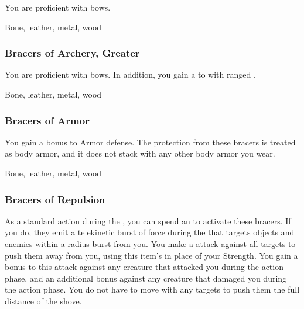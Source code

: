 You are proficient with bows.



 Bone, leather, metal, wood


\lowercase{\hypertarget{item:Bracers of Archery, Greater}{}}\label{item:Bracers of Archery, Greater}
\hypertarget{item:Bracers of Archery, Greater}{\subsubsection{Bracers of Archery, Greater\hfill{}}}

You are proficient with bows.
In addition, you gain a   to  with ranged .



 Bone, leather, metal, wood


\lowercase{\hypertarget{item:Bracers of Armor}{}}\label{item:Bracers of Armor}
\hypertarget{item:Bracers of Armor}{\subsubsection{Bracers of Armor\hfill{}}}

You gain a  bonus to Armor defense.
The protection from these bracers is treated as body armor, and it does not stack with any other body armor you wear.



 


 Bone, leather, metal, wood


\lowercase{\hypertarget{item:Bracers of Repulsion}{}}\label{item:Bracers of Repulsion}
\hypertarget{item:Bracers of Repulsion}{\subsubsection{Bracers of Repulsion\hfill{}}}

As a standard action during the , you can spend an  to activate these bracers.
If you do, they emit a telekinetic burst of force during the  that targets objects and enemies within a \areamed radius burst from you.
You make a  attack against all targets to push them away from you, using this item's  in place of your Strength.
You gain a  bonus to this attack against any creature that attacked you during the action phase,
and an additional  bonus against any creature that damaged you during the action phase.
You do not have to move with any targets to push them the full distance of the shove.



